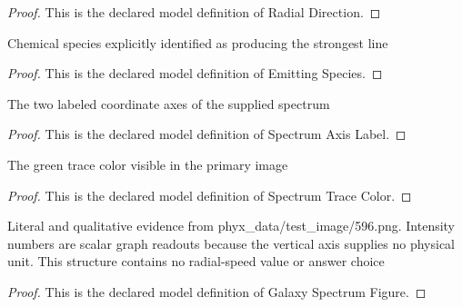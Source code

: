 \begin{proof}
  This is the declared model definition of Radial Direction.
\end{proof}
\begin{definition}
  \label{def:physics:phyx-mini-0596:phyxminiproblems-problemphyxmini0596-emittingspecies}
  Chemical species explicitly identified as producing the strongest line
\end{definition}
\begin{proof}
  This is the declared model definition of Emitting Species.
\end{proof}
\begin{definition}
  \label{def:physics:phyx-mini-0596:phyxminiproblems-problemphyxmini0596-spectrumaxislabel}
  The two labeled coordinate axes of the supplied spectrum
\end{definition}
\begin{proof}
  This is the declared model definition of Spectrum Axis Label.
\end{proof}
\begin{definition}
  \label{def:physics:phyx-mini-0596:phyxminiproblems-problemphyxmini0596-spectrumtracecolor}
  The green trace color visible in the primary image
\end{definition}
\begin{proof}
  This is the declared model definition of Spectrum Trace Color.
\end{proof}
\begin{definition}
  \label{def:physics:phyx-mini-0596:phyxminiproblems-problemphyxmini0596-galaxyspectrumfigure}
  Literal and qualitative evidence from phyx\_data/test\_image/596.png. Intensity numbers are scalar graph readouts because the vertical axis supplies no physical unit. This structure contains no radial-speed value or answer choice
\end{definition}
\begin{proof}
  This is the declared model definition of Galaxy Spectrum Figure.
\end{proof}
